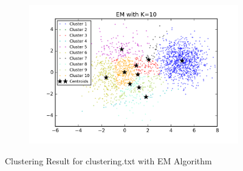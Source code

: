 \begin{figure}[htb]
\begin{subfigure}[b]{0.475\textwidth}
            \includegraphics[width=\textwidth]{./figures/clustering_EM_10.png}
        \end{subfigure}
        
        \caption{Clustering Result for clustering.txt with EM Algorithm}
        \label{fig:kmean_clustering}
\end{figure}

